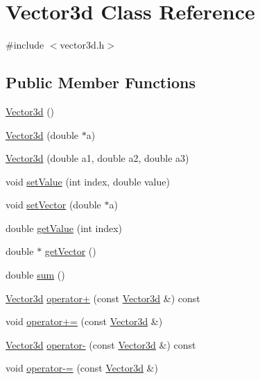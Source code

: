 \hypertarget{classVector3d}{\section{\-Vector3d \-Class \-Reference}
\label{df/dd0/classVector3d}
}


{\ttfamily \#include $<$vector3d.\-h$>$}

\subsection*{\-Public \-Member \-Functions}
\begin{DoxyCompactItemize}
\item 
\hyperlink{classVector3d_aac098d8695c4288e4844835e62945244}{\-Vector3d} ()
\item 
\hyperlink{classVector3d_a9e5a8c606f27fe366d2075f6bc4759a6}{\-Vector3d} (double $\ast$a)
\item 
\hyperlink{classVector3d_af61756bf2e679ccf2a5c0fd742ae3e6c}{\-Vector3d} (double a1, double a2, double a3)
\item 
void \hyperlink{classVector3d_ac20e0cda09c96f83cc41e23300c303ca}{set\-Value} (int index, double value)
\item 
void \hyperlink{classVector3d_a82c251f7203e08ec50ea55222f40525f}{set\-Vector} (double $\ast$a)
\item 
double \hyperlink{classVector3d_a37055dde72eed6770cf3b2b11b56f0f8}{get\-Value} (int index)
\item 
double $\ast$ \hyperlink{classVector3d_a12ca89ab46c79eb78fa6b75cad1a3616}{get\-Vector} ()
\item 
double \hyperlink{classVector3d_a76fa7fc5a86ba77a6764eb0d9072e90a}{sum} ()
\item 
\hyperlink{classVector3d}{\-Vector3d} \hyperlink{classVector3d_ad714ad56910f370335c18262dc5cc13a}{operator+} (const \hyperlink{classVector3d}{\-Vector3d} \&) const 
\item 
void \hyperlink{classVector3d_a034e9f847d613c9cba1cb47202b8143a}{operator+=} (const \hyperlink{classVector3d}{\-Vector3d} \&)
\item 
\hyperlink{classVector3d}{\-Vector3d} \hyperlink{classVector3d_a727932bfb1f230c8f256e10a0d45a8c7}{operator-\/} (const \hyperlink{classVector3d}{\-Vector3d} \&) const 
\item 
void \hyperlink{classVector3d_a14d45e123683a1f1a2ba32d43083fcd7}{operator-\/=} (const \hyperlink{classVector3d}{\-Vector3d} \&)
\item 

\end{DoxyCompactItemize}
